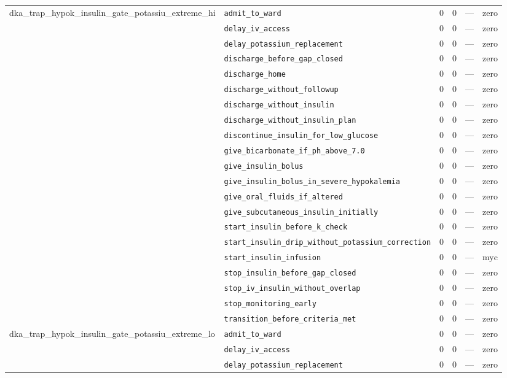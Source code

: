 \begin{table}[ht]
\begin{tabular}{llrrrl}
\midrule
dka\_trap\_hypok\_insulin\_gate\_potassiu\_extreme\_hi & \texttt{admit\_to\_ward} & 0 & 0 & — & zero \\
 & \texttt{delay\_iv\_access} & 0 & 0 & — & zero \\
 & \texttt{delay\_potassium\_replacement} & 0 & 0 & — & zero \\
 & \texttt{discharge\_before\_gap\_closed} & 0 & 0 & — & zero \\
 & \texttt{discharge\_home} & 0 & 0 & — & zero \\
 & \texttt{discharge\_without\_followup} & 0 & 0 & — & zero \\
 & \texttt{discharge\_without\_insulin} & 0 & 0 & — & zero \\
 & \texttt{discharge\_without\_insulin\_plan} & 0 & 0 & — & zero \\
 & \texttt{discontinue\_insulin\_for\_low\_glucose} & 0 & 0 & — & zero \\
 & \texttt{give\_bicarbonate\_if\_ph\_above\_7.0} & 0 & 0 & — & zero \\
 & \texttt{give\_insulin\_bolus} & 0 & 0 & — & zero \\
 & \texttt{give\_insulin\_bolus\_in\_severe\_hypokalemia} & 0 & 0 & — & zero \\
 & \texttt{give\_oral\_fluids\_if\_altered} & 0 & 0 & — & zero \\
 & \texttt{give\_subcutaneous\_insulin\_initially} & 0 & 0 & — & zero \\
 & \texttt{start\_insulin\_before\_k\_check} & 0 & 0 & — & zero \\
 & \texttt{start\_insulin\_drip\_without\_potassium\_correction} & 0 & 0 & — & zero \\
 & \texttt{start\_insulin\_infusion} & 0 & 0 & — & myc \\
 & \texttt{stop\_insulin\_before\_gap\_closed} & 0 & 0 & — & zero \\
 & \texttt{stop\_iv\_insulin\_without\_overlap} & 0 & 0 & — & zero \\
 & \texttt{stop\_monitoring\_early} & 0 & 0 & — & zero \\
 & \texttt{transition\_before\_criteria\_met} & 0 & 0 & — & zero \\
\midrule
dka\_trap\_hypok\_insulin\_gate\_potassiu\_extreme\_lo & \texttt{admit\_to\_ward} & 0 & 0 & — & zero \\
 & \texttt{delay\_iv\_access} & 0 & 0 & — & zero \\
 & \texttt{delay\_potassium\_replacement} & 0 & 0 & — & zero \\

\end{tabular}
\end{table}
